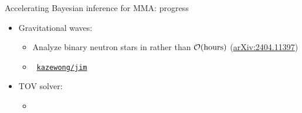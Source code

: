 \documentclass[usenames,dvipsnames,t]{beamer}
\begin{document}
\begin{frame}{Accelerating Bayesian inference for MMA: progress}

  \def\x{4mm}
  \def\y{2mm}

  \begin{itemize}

    \item Gravitational waves: 
    \vspace{\y}
    \begin{itemize}
      \item Analyze binary neutron stars in  rather than $\mathcal{O}(\rm{hours})$ (\href{https://arxiv.org/abs/2404.11397}{arXiv:2404.11397})
      
      \vspace{\y}
      
      \item \faGithub~\href{https://github.com/kazewong/jim}{\texttt{kazewong/jim}}
    \end{itemize}

    \pause
    \vspace{\x}
    
      
    

    


    \item TOV solver: 
    \vspace{\y}
    \begin{itemize}
      \item {}
      

\end{itemize}
\end{itemize}
\end{frame}
\end{document}

